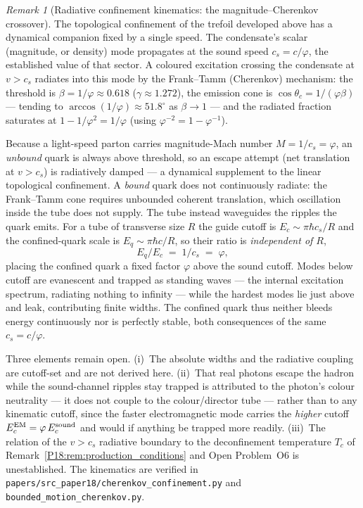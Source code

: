 \documentclass[11pt,a4paper]{article}
\theoremstyle{definition}\newtheorem{definition}[theorem]{Definition}
\theoremstyle{remark}
\newtheorem{remark}[theorem]{Remark}
\newcommand{\vp}{\varphi}
\begin{document}
\begin{remark}[Radiative confinement kinematics: the magnitude--Cherenkov crossover]
\label{P18:rem:cherenkov_confinement}
The topological confinement of the trefoil developed above has a dynamical
companion fixed by a single speed. The condensate's scalar (magnitude, or
density) mode propagates at the sound speed $c_s=c/\vp$, the established
value of that sector. A coloured excitation crossing the condensate at
$v>c_s$ radiates into this mode by the Frank--Tamm (Cherenkov) mechanism:
the threshold is $\beta=1/\vp\approx0.618$ ($\gamma\approx1.272$), the
emission cone is $\cos\theta_c=1/(\vp\beta)$ --- tending to
$\arccos(1/\vp)\approx51.8^\circ$ as $\beta\to1$ --- and the radiated
fraction saturates at $1-1/\vp^{2}=1/\vp$ (using $\vp^{-2}=1-\vp^{-1}$).

Because a light-speed parton carries magnitude-Mach number $M=1/c_s=\vp$,
an \emph{unbound} quark is always above threshold, so an escape attempt
(net translation at $v>c_s$) is radiatively damped --- a dynamical
supplement to the linear topological confinement. A \emph{bound} quark
does not continuously radiate: the Frank--Tamm cone requires unbounded
coherent translation, which oscillation inside the tube does not supply.
The tube instead waveguides the ripples the quark emits. For a tube of
transverse size $R$ the guide cutoff is $E_c\sim\pi\hbar c_s/R$ and the
confined-quark scale is $E_q\sim\pi\hbar c/R$, so their ratio is
\emph{independent of $R$},
\begin{equation}
  E_q/E_c \;=\; 1/c_s \;=\; \vp,
  \label{P18:eq:confined_mach}
\end{equation}
placing the confined quark a fixed factor $\vp$ above the sound cutoff.
Modes below cutoff are evanescent and trapped as standing waves --- the
internal excitation spectrum, radiating nothing to infinity --- while the
hardest modes lie just above and leak, contributing finite widths. The
confined quark thus neither bleeds energy continuously nor is perfectly
stable, both consequences of the same $c_s=c/\vp$.

Three elements remain open. (i)~The absolute widths and the radiative
coupling are cutoff-set and are not derived here. (ii)~That real photons
escape the hadron while the sound-channel ripples stay trapped is
attributed to the photon's colour neutrality --- it does not couple to the
colour/director tube --- rather than to any kinematic cutoff, since the
faster electromagnetic mode carries the \emph{higher} cutoff
$E_c^{\rm EM}=\vp\,E_c^{\rm sound}$ and would if anything be trapped more
readily. (iii)~The relation of the $v>c_s$ radiative boundary to the
deconfinement temperature $T_c$ of
Remark~\ref{P18:rem:production_conditions} and Open Problem~O6 is
unestablished. The kinematics are verified in
\texttt{papers/src\_paper18/cherenkov\_confinement.py} and
\texttt{bounded\_motion\_cherenkov.py}.
\end{remark}
\end{document}
